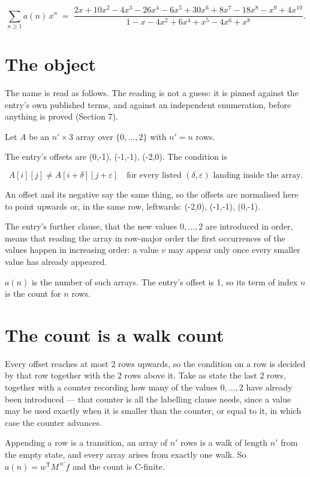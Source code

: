 \documentclass[11pt]{article}
\theoremstyle{definition}
\begin{document}
\[\sum_{n \ge 1} a(n)\,x^n \;=\; \frac{2x + 10x^{2} - 4x^{3} - 26x^{4} - 6x^{5} + 30x^{6} + 8x^{7} - 18x^{8} - x^{9} + 4x^{10}}{1 - x - 4x^{2} + 6x^{4} + x^{5} - 4x^{6} + x^{8}}.\]

\section{The object}

The name is read as follows. The reading is not a guess: it is pinned against the entry's own published terms, and against an independent enumeration, before anything is proved (Section 7).

Let $A$ be an $n' \times 3$ array over $\{0,\dots,2\}$ with $n' = n$ rows.

The entry's offsets are (0,-1), (-1,-1), (-2,0). The condition is

\[A[i][j] \ne A[i{+}\delta][j{+}\varepsilon]\quad\text{for every listed }(\delta,\varepsilon)\text{ landing inside the array.}\]

An offset and its negative say the same thing, so the offsets are normalised here to point upwards or, in the same row, leftwards: (-2,0), (-1,-1), (0,-1).

The entry's further clause, that the new values $0,\dots,2$ are introduced in order, means that reading the array in row-major order the first occurrences of the values happen in increasing order: a value $v$ may appear only once every smaller value has already appeared.

$a(n)$ is the number of such arrays. The entry's offset is 1, so its term of index $n$ is the count for $n$ rows.

\section{The count is a walk count}

Every offset reaches at most $2$ rows upwards, so the condition on a row is decided by that row together with the $2$ rows above it. Take as state the last $2$ rows, together with a counter recording how many of the values $0,\dots,2$ have already been introduced --- that counter is all the labelling clause needs, since a value may be used exactly when it is smaller than the counter, or equal to it, in which case the counter advances.

Appending a row is a transition, an array of $n'$ rows is a walk of length $n'$ from the empty state, and every array arises from exactly one walk. So $a(n) = w^{\mathsf T}M^{\,n'}f$ and the count is C-finite.
\end{document}
